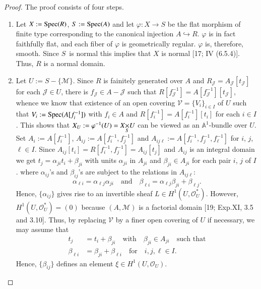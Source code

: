 \begin{proof}
The proof consists of four steps.
\begin{enumerate}
\renewcommand{\theenumi}{\Roman{enumi}}
\renewcommand{\labelenumi}{(\theenumi)}
\item Let $X:=\operatorname{Spec}(R)$, $S:=\operatorname{Spec}(A)$ and let $\varphi:X\to S$ be the
  flat morphism of finite type corresponding to the canonical
  injection $A\hookrightarrow R$. $\varphi$ is in fact faithfully
  flat, and each fiber of $\varphi$ is geometrically
  regular. $\varphi$ is, therefore, smooth. Since $S$\pageoriginale\ is
  normal this implies that $X$ is normal [17; IV (6.5.4)]. Thus, $R$
  is a normal domain.

\item Let $U:=S-\{\mathscr{M}\}$. Since $R$ is fainitely generated
  over $A$ and $R_{\mathscr{J}}=A_{\mathscr{J}}[t_{\mathscr{J}}]$ for
  each $\mathscr{J}\in U$, there is $f_{\mathscr{J}}\in A-\mathscr{J}$
  such that
  $R[f^{-1}_{\mathscr{J}}]=A[f^{-1}_{\mathscr{J}}][t_{\mathscr{J}}]$,
    whence we know that existence of an open covering
    $\mathscr{V}=\{V_{i}\}_{i\in I}$ of $U$ such that $V_{i}:=\operatorname{Spec}
    (A[f^{-1}_{i}])$ with $f_{i}\in A$ and
    $R[f^{-1}_{i}]=A[f^{-1}_{i}][t_{i}]$ for each $i\in I$. This shows
    that $X_{U}:=\varphi^{-1}(U)=\fprod{X}{U}{S}$ can be viewed as an
    $\mathbb{A}^{1}$-bundle over $U$. Set $A_{i}:=A[f^{-1}_{i}]$,
    $A_{ij}:=A[f^{-1}_{i},f^{-1}_{j}]$ and
    $A_{ij\ell}:=A[f^{-1}_{i},f^{-1}_{j},f^{-1}_{\ell}]$ for $i$, $j$,
    $\ell\in I$. Since
    $A_{ij}[t_{i}]=R[f^{-1}_{i},f^{-1}_{j}]=A_{ij}[t_{j}]$ and
    $A_{ij}$ is an integral domain we get
    $t_{j}=\alpha_{ji}t_{i}+\beta_{ji}$ with units $\alpha_{ji}$ in
    $A_{ji}$ and $\beta_{ji}\in A_{ji}$ for each pair $i$, $j$ of
    $I$. where $\alpha_{ij}$'s and $\beta_{ij}$'s are subject to the
    relations in $A_{ij\ell}$:
$$
\alpha_{\ell i}=\alpha_{\ell j}\alpha_{ji}\quad\text{and}\quad
\beta_{\ell i}=\alpha_{\ell j}\beta_{ji}+\beta_{\ell j}.
$$
Hence, $\{\alpha_{ij}\}$ gives rise to an invertible sheaf $L\in
H^{1}(U,\mathscr{O}^{\ast}_{U})$. However,
$H^{1}(U,\mathscr{O}^{\ast}_{U})=(0)$ because $(A,\mathscr{M})$ is a
factorial domain [19; Exp.\@ XI, 3.5 and 3.10]. Thus, by replacing
$\mathscr{V}$ by a finer open covering of $U$ if necessary, we may
assume that
\begin{align*}
t_{j} &= t_{i}+\beta_{ji}\quad\text{with}\quad \beta_{ji}\in
A_{ji}\quad\text{such that}\\
\beta_{\ell i} &= \beta_{ji}+\beta_{\ell i}\quad\text{for}\quad
i,j,\ell\in I.\tag{3}
\end{align*}
Hence, $\{\beta_{ij}\}$ defines an element $\xi\in
H^{1}(U,\mathscr{O}_{U})$.


\end{enumerate}
\end{proof}
